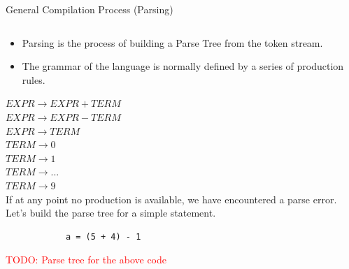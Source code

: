 \documentclass{beamer}
\newcommand{\todo}[1]{\textcolor{red}{TODO: #1}}
\begin{document}
\begin{frame}[fragile]{General Compilation Process (Parsing)}
\begin{columns}[T,onlytextwidth]
        \begin{overprint}
            \begin{itemize}
                \item Parsing is the process of building a Parse Tree from the token stream.
                \item The grammar of the language is normally defined by a series of production rules.
            \end{itemize}

            \hspace*{2cm}$EXPR \rightarrow EXPR + TERM$ \\
            \hspace*{2cm}$EXPR \rightarrow EXPR - TERM$ \\
            \hspace*{2cm}$EXPR \rightarrow TERM$ \\
            \hspace*{2cm}$TERM \rightarrow 0$ \\
            \hspace*{2cm}$TERM \rightarrow 1$ \\
            \hspace*{2cm}$TERM \rightarrow ...$ \\
            \hspace*{2cm}$TERM \rightarrow 9$ \\

            If at any point no production is available, we have encountered a parse error.
            Let's build the parse tree for a simple statement.
            \begin{lstlisting}
            a = (5 + 4) - 1
            \end{lstlisting}

            \todo{Parse tree for the above code}


\end{overprint}
\end{columns}
\end{frame}
\end{document}

